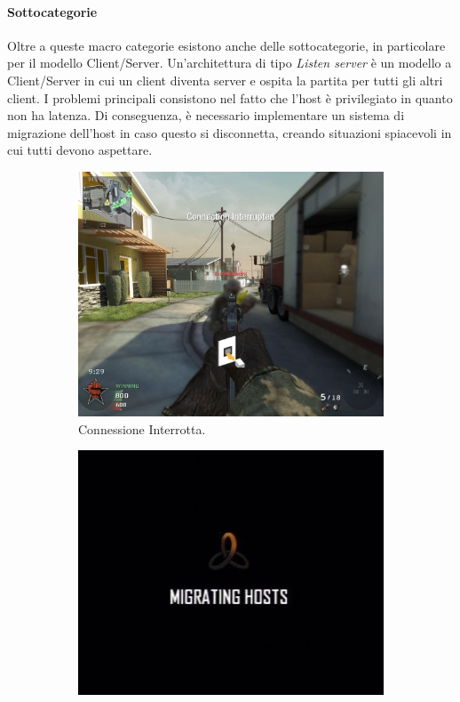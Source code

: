 \paragraph{Sottocategorie}
Oltre a queste macro categorie esistono anche delle sottocategorie, in particolare per il modello Client/Server.
Un'architettura di tipo \emph{Listen server} è un modello a Client/Server in cui un client diventa server e ospita la partita per tutti gli altri client. I problemi principali consistono nel fatto che l'host è privilegiato in quanto non ha latenza. Di conseguenza, è necessario implementare un sistema di migrazione dell'host in caso questo si disconnetta, creando situazioni spiacevoli in cui tutti devono aspettare.

\begin{figure}[!ht]
    \begin{subfigure}{.49\textwidth}
      \centering
      \includegraphics[width=.95\linewidth]{gfx/imgs/chapter3/CoDBOConnectionInterrupted.png}
      \caption{Connessione Interrotta.}
      \label{fig:connection-interrupted}
    \end{subfigure}
    \begin{subfigure}{.49\textwidth}
      \centering
      \includegraphics[width=.95\linewidth]{gfx/imgs/chapter3/CoDBO2MigratingHosts.png}

\end{subfigure}
\end{figure}
